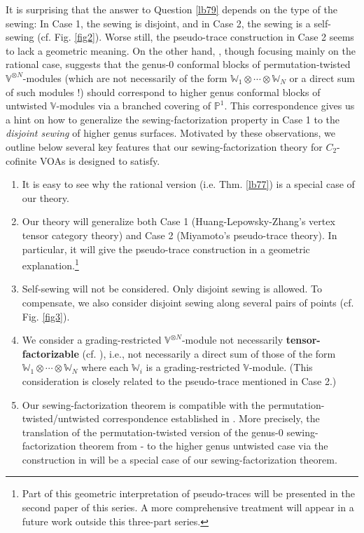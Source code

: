 \documentclass[11pt,b5paper,notitlepage]{article}
\theoremstyle{definition}
\theoremstyle{plain}
\newcommand{\Vbb}{\mathbb V}
\newcommand{\Wbb}{\mathbb W}
\newcommand{\Pbb}{\mathbb P}
\newcommand{\<}{\left\langle}
\renewcommand{\>}{\right\rangle}
\numberwithin{equation}{section}
\begin{document}
It is surprising that the answer to Question \ref{lb79} depends on the type of the sewing: In Case 1, the sewing is disjoint, and in Case 2, the sewing is a self-sewing (cf. Fig. \ref{fig2}). Worse still, the pseudo-trace construction in Case 2 seems to lack a geometric meaning. On the other hand, \cite{Gui-permutation}, though focusing mainly on the rational case, suggests that the genus-$0$ conformal blocks of permutation-twisted $\Vbb^{\otimes N}$-modules (which are not necessarily of the form $\Wbb_1\otimes\cdots\otimes\Wbb_N$ or a direct sum of such modules !) should correspond to higher genus conformal blocks of untwisted $\Vbb$-modules via a branched covering of $\Pbb^1$. This correspondence gives us a hint on how to generalize the sewing-factorization property in Case 1 to the \emph{disjoint sewing} of higher genus surfaces. Motivated by these observations, we outline below several key features that our sewing-factorization theory for $C_2$-cofinite VOAs is designed to satisfy.
\begin{enumerate}[align=left, label=R\arabic*.]
\item It is easy to see why the rational version (i.e. Thm. \ref{lb77}) is a special case of our theory.
\item Our theory will generalize both Case 1 (Huang-Lepowsky-Zhang's vertex tensor category theory) and Case 2 (Miyamoto's pseudo-trace theory). In particular, it will give the pseudo-trace construction in \cite{Miy-modular-invariance,AN-pseudo-trace,Fio-genus-1,Hua-modular-C2} a geometric explanation.\footnote{Part of this geometric interpretation of pseudo-traces will be presented in the second paper of this series. A more comprehensive treatment will appear in a future work outside this three-part series.}
\item Self-sewing will not be considered. Only disjoint sewing is allowed. To compensate, we also consider disjoint sewing along several pairs of points (cf. Fig. \ref{fig3}).
\item We consider a grading-restricted $\Vbb^{\otimes N}$-module not necessarily \textbf{tensor-factorizable} (cf. \cite{Gui-permutation}), i.e., not necessarily a direct sum of those of the form $\Wbb_1\otimes\cdots\otimes\Wbb_N$ where each $\Wbb_i$ is a grading-restricted $\Vbb$-module. (This consideration is closely related to the pseudo-trace mentioned in Case 2.)
\item Our sewing-factorization theorem is compatible with the permutation-twisted/untwisted correspondence established in \cite{Gui-permutation}. More precisely, the translation of the permutation-twisted version of the genus-$0$ sewing-factorization theorem from \cite{HLZ1,HLZ2}-\cite{HLZ8} to the higher genus untwisted case via the construction in \cite{Gui-permutation} will be a special case of our sewing-factorization theorem.
\end{enumerate}
\end{document}
